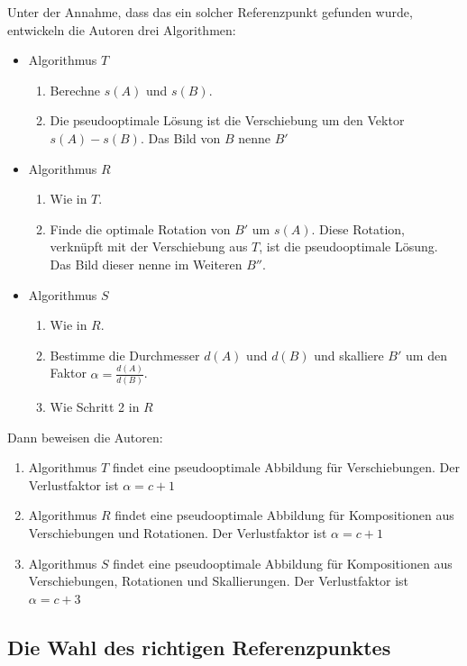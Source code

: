 Unter der Annahme, dass das ein solcher Referenzpunkt gefunden wurde, entwickeln die Autoren drei Algorithmen:
\begin{itemize}
\item Algorithmus $T$
\begin{enumerate}
\item Berechne $s(A)$ und $s(B)$.
\item Die pseudooptimale Lösung ist die Verschiebung um den Vektor $s(A)-s(B)$. Das Bild von $B$ nenne $B'$
\end{enumerate}

\item Algorithmus $R$
\begin{enumerate}
\item Wie in $T$.
\item Finde die optimale Rotation von $B'$ um $s(A)$. Diese Rotation, verknüpft mit der Verschiebung aus $T$, ist die pseudooptimale Lösung. Das Bild dieser nenne im Weiteren $B''$.

\end{enumerate}
\item Algorithmus $S$
\begin{enumerate}
\item Wie in $R$.
\item Bestimme die Durchmesser $d(A)$ und $d(B)$ und skalliere $B'$ um den Faktor $\alpha =\frac{d(A)}{d(B)}$.
\item Wie Schritt 2 in $R$ 
\end{enumerate}
\end{itemize}

Dann beweisen die Autoren:
\begin{enumerate}
\item Algorithmus $T$ findet eine pseudooptimale Abbildung für Verschiebungen. Der Verlustfaktor ist $\alpha=c+1$
\item Algorithmus $R$ findet eine pseudooptimale Abbildung für Kompositionen aus Verschiebungen und Rotationen.  Der Verlustfaktor ist $\alpha=c+1$
\item Algorithmus $S$ findet eine pseudooptimale Abbildung für Kompositionen aus Verschiebungen, Rotationen und Skallierungen. Der Verlustfaktor ist $\alpha=c+3$
\end{enumerate}

\subsection{Die Wahl des richtigen Referenzpunktes}

